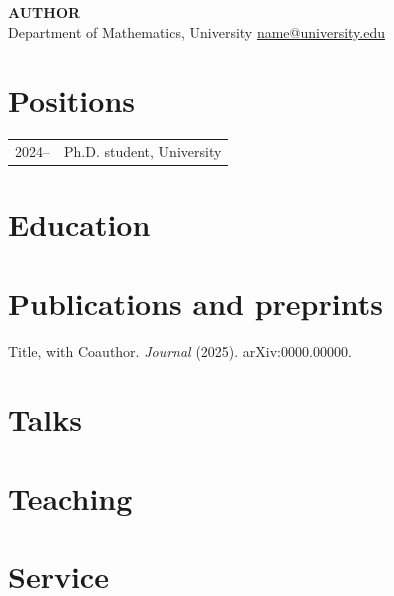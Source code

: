 \documentclass[11pt]{article}
\begin{document}
{\LARGE\bfseries {{AUTHOR}}}\\[3pt]
Department of Mathematics, University \textbullet{} \href{mailto:name@university.edu}{name@university.edu}
\section{Positions}
\begin{tabular}{@{}p{2.5cm}l}
2024-- & Ph.D. student, University\\
\end{tabular}
\section{Education}
\section{Publications and preprints}
\begin{enumerate}[label={[\arabic*]}]
  \item Title, with Coauthor. \emph{Journal} (2025). arXiv:0000.00000.
\end{enumerate}
\section{Talks}
\section{Teaching}
\section{Service}
\end{document}
